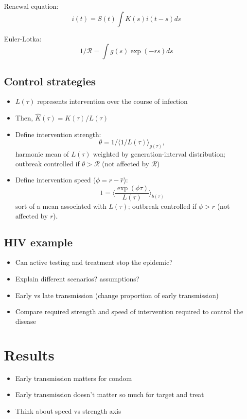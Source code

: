 \documentclass{article}\usepackage[]{graphicx}\usepackage[]{color}
\newcommand{\RR}{\ensuremath{{\mathcal R}}}
\begin{document}
Renewal equation:
\begin{equation}
i(t) = S(t) \int K(s) i(t-s) ds
\end{equation}

Euler-Lotka:
\begin{equation}
1/\RR = \int g(s) \exp(-rs) ds
\end{equation}

\subsection{Control strategies}

\begin{itemize}
	\item $L(\tau)$ represents intervention over the course of infection
	\item Then, $\hat K(\tau) = K(\tau)/L(\tau)$
	\item Define intervention strength:
	$$
	\theta = 1/\langle 1/L(\tau) \rangle_{g(\tau)},
	$$
	harmonic mean of $L(\tau)$ weighted by generation-interval distribution; outbreak controlled if $\theta > \mathcal R$ (not affected by $\RR$)
	\item Define intervention speed ($\phi = r - \hat r$):
	$$
	1 = \langle \frac{\exp(\phi \tau) }{L(\tau)} \rangle_{b(\tau)}
	$$
	sort of a mean associated with $L(\tau)$; outbreak controlled if $\phi > r$ (not affected by $r$).
\end{itemize}

\subsection{HIV example}

\begin{itemize}
	\item Can active testing and treatment stop the epidemic?
	\item Explain different scenarios? assumptions?
	\item Early vs late transmission (change proportion of early transmission)
	\item Compare required strength and speed of intervention required to control the disease
\end{itemize}

\section{Results}

\begin{itemize}
	\item Early transmission matters for condom
	\item Early transmission doesn't matter so much for target and treat
	\item Think about speed vs strength axis
\end{itemize}
\end{document}

